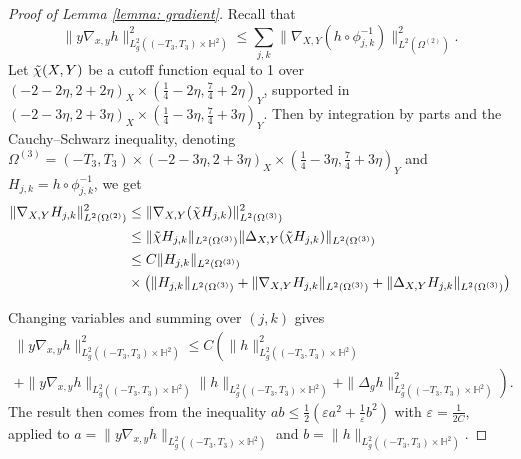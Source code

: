 \documentclass[10pt,a4paper]{amsart}
\begin{document}
\begin{proof}[Proof of Lemma \ref{lemma: gradient}]
    Recall that $$\|y\nabla_{x,y} h \|_{L^2_g((-T_3, T_3) \times \mathbb{H}^2)}^2 \leq \sum_{j,k} \|\nabla_{X,Y} (h \circ \phi_{j,k}^{-1})\|_{L^2(\Omega^{(2)})}^2.$$ Let $\Tilde{\chi}(X,Y)$ be a cutoff function equal to 1 over $(-2-2\eta,2+2\eta)_X \times (\frac{1}{4}-2\eta, \frac{7}{4}+ 2\eta)_Y$, supported in $(-2-3\eta,2+3\eta)_X \times (\frac{1}{4}-3\eta, \frac{7}{4}+3\eta)_Y$. Then by integration by parts and the Cauchy--Schwarz inequality, denoting $\Omega^{(3)}=(-T_3,T_3) \times (-2-3\eta,2+3\eta)_X \times (\frac{1}{4}-3\eta, \frac{7}{4}+3\eta)_Y$ and $H_{j,k} = h \circ \phi_{j,k}^{-1}$, we get 
    $$\begin{aligned}
        \|\nabla_{X,Y} H_{j,k}\|_{L^2(\Omega^{(2)})}^2 &\leq \|\nabla_{X,Y} (\Tilde{\chi} H_{j,k})\|_{L^2(\Omega^{(3)})}^2 \\
        &\leq \|\Tilde{\chi} H_{j,k}\|_{L^2(\Omega^{(3)})} \|\Delta_{X,Y} (\Tilde{\chi} H_{j,k})\|_{L^2(\Omega^{(3)})} \\
        &\leq C \|H_{j,k}\|_{L^2(\Omega^{(3)})} \\
        &\times \left(\|H_{j,k}\|_{L^2(\Omega^{(3)})} + \|\nabla_{X,Y} H_{j,k}\|_{L^2(\Omega^{(3)})} + \|\Delta_{X,Y} H_{j,k}\|_{L^2(\Omega^{(3)})}\right)
    \end{aligned}$$

    Changing variables and summing over $(j,k)$ gives \begin{multline}\|y\nabla_{x,y} h \|_{L^2_g((-T_3, T_3) \times \mathbb{H}^2)}^2 \leq C \left( \|h\|_{L^2_g((-T_3, T_3) \times \mathbb{H}^2)}^2 \right.\\ \left.+ \|y\nabla_{x,y}h\|_{L^2_g((-T_3, T_3) \times \mathbb{H}^2)} \|h\|_{L^2_g((-T_3, T_3) \times \mathbb{H}^2)} + \|\Delta_g h\|_{L^2_g((-T_3, T_3) \times \mathbb{H}^2)}^2\right).\end{multline}
    The result then comes from the inequality $ab \leq \frac{1}{2} (\varepsilon a^2 + \frac{1}{\varepsilon} b^2)$ with $\varepsilon = \frac{1}{2C}$, applied to $a = \|y\nabla_{x,y}h\|_{L^2_g((-T_3, T_3) \times \mathbb{H}^2)}$ and $b = \|h\|_{L^2_g((-T_3, T_3) \times \mathbb{H}^2)}$.
\end{proof}
\end{document}
